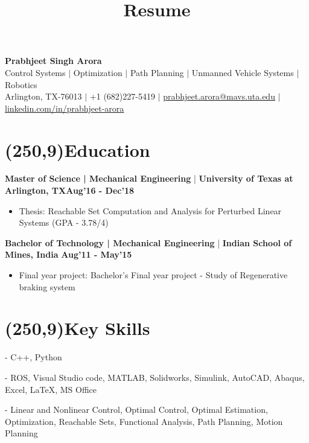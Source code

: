 \documentclass[10pt,a4paper]{extarticle}
\title{Resume}
\newcommand{\changeurlcolor}[1]{\hypersetup{urlcolor=#1}}
\begin{document}
\begin{center}
\textbf{\huge {Prabhjeet Singh Arora}}\\
\small{Control Systems $|$ Optimization $|$ Path Planning $|$ Unmanned Vehicle Systems $|$ Robotics}\\
\small{Arlington, TX-76013 $|$ +1 (682)227-5419 $|$ \href{prabhjeet.arora@mavs.uta.edu}{\ul{prabhjeet.arora@mavs.uta.edu}} $|$ \changeurlcolor{cyan}\href{http://www.linkedin.com/in/prabhjeet-arora}{\ul{linkedin.com/in/prabhjeet-arora}}}
\end{center}

\section*{\colorbox{gray!10}{\makebox(250,9){\textcolor{blue!65}{Education\hfill}}}}
\textbf{Master of Science | Mechanical Engineering} | \textbf{University of Texas at Arlington, TX}\hfill\textbf{Aug'16 - Dec'18}
\vspace{-0.5em}
\begin{itemize}[leftmargin = 0.6cm]
\setlength\itemsep{-0.2em}
\item Thesis: Reachable Set Computation and Analysis for Perturbed Linear Systems \hfill(GPA - 3.78/4) 
\end{itemize}
\textbf{Bachelor of Technology | Mechanical Engineering} | \textbf{Indian School of Mines, India} \hfill\textbf{Aug'11 - May'15}
\vspace{-0.5em}
\begin{itemize}[leftmargin = 0.6cm]
\setlength\itemsep{-0.2em}
\item Final year project: Bachelor's Final year project - Study of Regenerative braking system
\end{itemize}

\section*{\colorbox{gray!10}{\makebox(250,9){\textcolor{blue!65}{Key Skills\hfill}}}}
\begin{description}[align=left,labelwidth=1.8cm,leftmargin = 2.15cm]
\setlength\itemsep{-0.25em}
\item[Language ] - C++, Python
\item[Softwares ] - ROS, Visual Studio code, MATLAB, Solidworks, Simulink, AutoCAD, Abaqus, Excel, LaTeX, MS Office
\item[Skills ]  - Linear and Nonlinear Control, Optimal Control, Optimal Estimation, Optimization, Reachable Sets, Functional Analysis, Path Planning, Motion Planning
\end{description}
\end{document}
